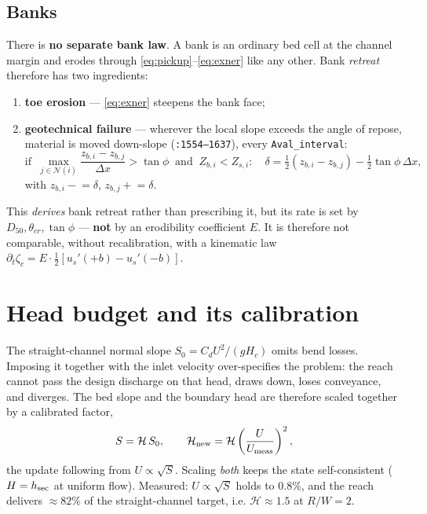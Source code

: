 \documentclass[11pt,a4paper]{article}
\newcommand{\dt}{\partial_t}
\newcommand{\code}[1]{\texttt{\small #1}}
\begin{document}
\subsection{Banks}
There is \textbf{no separate bank law}. A bank is an ordinary bed cell at the channel
margin and erodes through \eqref{eq:pickup}--\eqref{eq:exner} like any other. Bank
\emph{retreat} therefore has two ingredients:
\begin{enumerate}\itemsep2pt
  \item \textbf{toe erosion} --- \eqref{eq:exner} steepens the bank face;
  \item \textbf{geotechnical failure} --- wherever the local slope exceeds the angle of
        repose, material is moved down-slope (\code{:1554--1637}), every
        \code{Aval\_interval}:
        \begin{equation}
          \text{if }\ \max_{j\in\mathcal N(i)}\frac{z_{b,i}-z_{b,j}}{\Delta x}>\tan\phi
          \ \text{ and }\ Z_{b,i}<Z_{s,i}:\quad
          \delta=\tfrac12\left(z_{b,i}-z_{b,j}\right)-\tfrac12\tan\phi\,\Delta x,
        \end{equation}
        with $z_{b,i}\!\mathrel{-}=\delta$, $z_{b,j}\!\mathrel{+}=\delta$.
\end{enumerate}
This \emph{derives} bank retreat rather than prescribing it, but its rate is set by
$D_{50},\theta_{cr},\tan\phi$ --- \textbf{not} by an erodibility coefficient $E$. It is
therefore not comparable, without recalibration, with a kinematic law
$\dt\zeta_c=E\cdot\tfrac12[u_s'(+b)-u_s'(-b)]$.

\section{Head budget and its calibration}
\label{sec:head}

The straight-channel normal slope $S_0=C_dU^2/(gH_c)$ omits bend losses. Imposing it
together with the inlet velocity over-specifies the problem: the reach cannot pass the
design discharge on that head, draws down, loses conveyance, and diverges. The bed slope
and the boundary head are therefore scaled together by a calibrated factor,
\begin{equation}
  S = \mathcal H\,S_0,
  \qquad
  \mathcal H_{\rm new}=\mathcal H\left(\frac{U}{U_{\rm meas}}\right)^{2},
  \label{eq:hf}
\end{equation}
the update following from $U\propto\sqrt S$. Scaling \emph{both} keeps the state
self-consistent ($H=h_{\rm sec}$ at uniform flow). Measured: $U\propto\sqrt S$ holds to
$0.8\%$, and the reach delivers $\approx82\%$ of the straight-channel target, i.e.
$\mathcal H\approx1.5$ at $R/W=2$.
\end{document}
